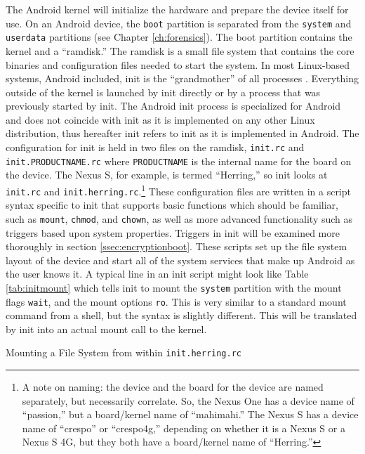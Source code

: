 The Android kernel will initialize the hardware and prepare the device itself for use. On an Android device, the \texttt{boot}
partition is separated from the \texttt{system} and \texttt{userdata} partitions (see Chapter \ref{ch:forensics}). The boot
partition contains the kernel and a ``ramdisk.''  The ramdisk is a small file system that contains the core binaries and
configuration files needed to start the system. In most Linux-based systems, Android included, init is the ``grandmother'' of all
processes \cite{eneaboot}. Everything outside of the kernel is launched by init directly or by a process that was previously started
by init. The Android init process is specialized for Android and does not coincide with init as it is implemented on any other Linux
distribution, thus hereafter init refers to init as it is implemented in Android.  The configuration for init is held in two files
on the ramdisk, \texttt{init.rc} and \texttt{init.PRODUCTNAME.rc} where \texttt{PRODUCTNAME} is the internal name for the board on
the device. The Nexus S, for example, is termed ``Herring,'' so init looks at \texttt{init.rc} and
\texttt{init.herring.rc}.\footnote{A note on naming: the device and the board for the device are named separately, but necessarily
correlate. So, the Nexus One has a device name of ``passion,'' but a board/kernel name of ``mahimahi.'' The Nexus S has a device
name of ``crespo'' or ``crespo4g,'' depending on whether it is a Nexus S or a Nexus S 4G, but they both have a board/kernel name of
``Herring.''} These configuration files are written in a script syntax specific to init that supports basic functions which should
be familiar, such as \texttt{mount}, \texttt{chmod}, and \texttt{chown}, as well as more advanced functionality such as triggers
based upon system properties.  Triggers in init will be examined more thoroughly in section \ref{ssec:encryptionboot}. These scripts
set up the file system layout of the device and start all of the system services that make up Android as the user knows it. A
typical line in an init script might look like Table \ref{tab:initmount} which tells init to mount the \texttt{system} partition
with the mount flags \texttt{wait}, and the mount options \texttt{ro}. This is very similar to a standard mount command from a
shell, but the syntax is slightly different. This will be translated by init into an actual mount call to the kernel. 
\begin{table}[!htb]

\caption{Mounting a File System from within \texttt{init.herring.rc}}
\label{tab:initmount}
\end{table}



